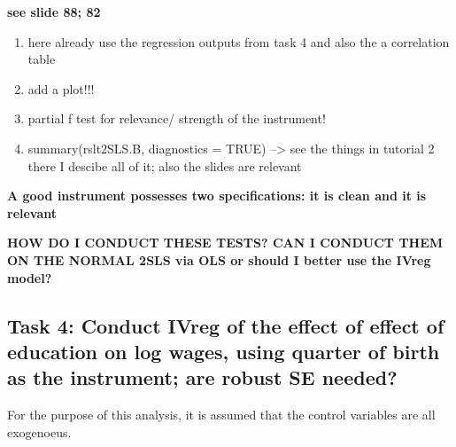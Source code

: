 \documentclass[a4paper]{article}
\begin{document}
\textbf{see slide 88; 82}

\begin{enumerate}
   \item here already use the regression outputs from task 4 and also the a correlation table 
   \item add a plot!!!
   \item partial f test for relevance/ strength of the instrument!
   \item summary(rslt2SLS.B, diagnostics = TRUE) --> see the things in tutorial 2 there I descibe all of it; also the slides are relevant
\end{enumerate}

\textbf{A good instrument possesses two specifications: it is clean and it is relevant}



\textbf{HOW DO I CONDUCT THESE TESTS? CAN I CONDUCT THEM ON THE NORMAL 2SLS via OLS or should I better use the IVreg model?}



\subsection{Task 4: Conduct IVreg of the effect of effect of education on log wages, using quarter of birth as the instrument; are robust SE needed?}

For the purpose of this analysis, it is assumed that the control variables are all exogenoeus. 
\end{document}
